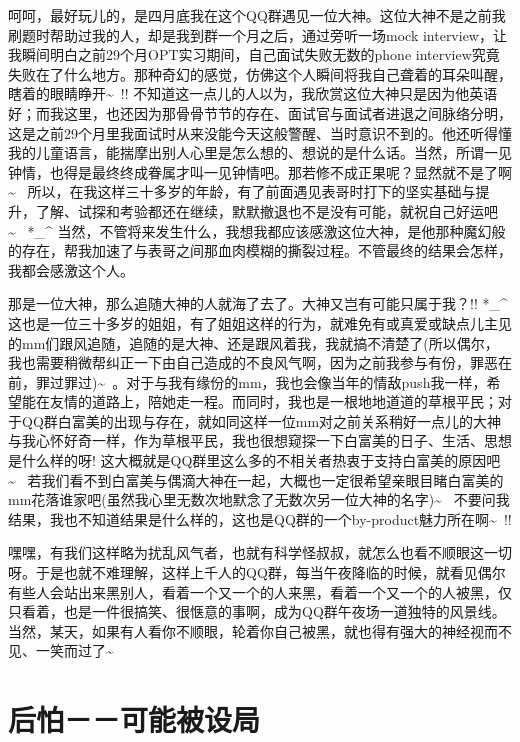 \documentclass[12pt]{book}
\begin{document}
呵呵，最好玩儿的，是四月底我在这个QQ群遇见一位大神。这位大神不是之前我刷题时帮助过我的人，却是我到群一个月之后，通过旁听一场mock interview，让我瞬间明白之前29个月OPT实习期间，自己面试失败无数的phone interview究竟失败在了什么地方。那种奇幻的感觉，仿佛这个人瞬间将我自己聋着的耳朵叫醒，瞎着的眼睛睁开\textasciitilde{}~!! 不知道这一点儿的人以为，我欣赏这位大神只是因为他英语好；而我这里，也还因为那骨骨节节的存在、面试官与面试者进退之间脉络分明，这是之前29个月里我面试时从来没能今天这般警醒、当时意识不到的。他还听得懂我的儿童语言，能揣摩出别人心里是怎么想的、想说的是什么话。当然，所谓一见钟情，也得是最终终成眷属才叫一见钟情吧。那若修不成正果呢？显然就不是了啊\textasciitilde{}~ 所以，在我这样三十多岁的年龄，有了前面遇见表哥时打下的坚实基础与提升，了解、试探和考验都还在继续，默默撤退也不是没有可能，就祝自己好运吧\textasciitilde{}~ *\_\^{} 当然，不管将来发生什么，我想我都应该感激这位大神，是他那种魔幻般的存在，帮我加速了与表哥之间那血肉模糊的撕裂过程。不管最终的结果会怎样，我都会感激这个人。

那是一位大神，那么追随大神的人就海了去了。大神又岂有可能只属于我？!! *\_\^{} 这也是一位三十多岁的姐姐，有了姐姐这样的行为，就难免有或真爱或缺点儿主见的mm们跟风追随，追随的是大神、还是跟风着我，我就搞不清楚了(所以偶尔，我也需要稍微帮纠正一下由自己造成的不良风气啊，因为之前我参与有份，罪恶在前，罪过罪过)\textasciitilde{}~。对于与我有缘份的mm，我也会像当年的情敌push我一样，希望能在友情的道路上，陪她走一程。而同时，我也是一根地地道道的草根平民；对于QQ群白富美的出现与存在，就如同这样一位mm对之前关系稍好一点儿的大神与我心怀好奇一样，作为草根平民，我也很想窥探一下白富美的日子、生活、思想是什么样的呀! 这大概就是QQ群里这么多的不相关者热衷于支持白富美的原因吧\textasciitilde{}~ 若我们看不到白富美与偶滴大神在一起，大概也一定很希望亲眼目睹白富美的mm花落谁家吧(虽然我心里无数次地默念了无数次另一位大神的名字)\textasciitilde{}~ 不要问我结果，我也不知道结果是什么样的，这也是QQ群的一个by-product魅力所在啊\textasciitilde{}~!!

嘿嘿，有我们这样略为扰乱风气者，也就有科学怪叔叔，就怎么也看不顺眼这一切呀。于是也就不难理解，这样上千人的QQ群，每当午夜降临的时候，就看见偶尔有些人会站出来黑别人，看着一个又一个的人来黑，看着一个又一个的人被黑，仅只看着，也是一件很搞笑、很惬意的事啊，成为QQ群午夜场一道独特的风景线。当然，某天，如果有人看你不顺眼，轮着你自己被黑，就也得有强大的神经视而不见、一笑而过了\textasciitilde{}~

\chapter{后怕－－可能被设局}
\label{sec-49}
\end{document}
